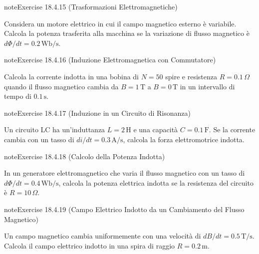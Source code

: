 \documentclass[letterpaper,10pt,italian]{jupyterBook}
\begin{document}
\begin{sphinxadmonition}{note}{Exercise 18.4.15 (Trasformazioni Elettromagnetiche)}



\sphinxAtStartPar
Considera un motore elettrico in cui il campo magnetico esterno è variabile. Calcola la potenza trasferita alla macchina se la variazione di flusso magnetico è \(d\Phi/dt = 0.2 \, \text{Wb/s}\).
\end{sphinxadmonition}
 \label{exercise:ch/electromagnetism/electromagnetism-general-problems-exercise-15}

\begin{sphinxadmonition}{note}{Exercise 18.4.16 (Induzione Elettromagnetica con Commutatore)}



\sphinxAtStartPar
Calcola la corrente indotta in una bobina di \(N = 50\) spire e resistenza \(R = 0.1 \, \Omega\) quando il flusso magnetico cambia da \(B = 1 \, \text{T}\) a \(B = 0 \, \text{T}\) in un intervallo di tempo di \(0.1 \, \text{s}\).
\end{sphinxadmonition}
 \label{exercise:ch/electromagnetism/electromagnetism-general-problems-exercise-16}

\begin{sphinxadmonition}{note}{Exercise 18.4.17 (Induzione in un Circuito di Risonanza)}



\sphinxAtStartPar
Un circuito LC ha un’induttanza \(L = 2 \, \text{H}\) e una capacità \(C = 0.1 \, \text{F}\). Se la corrente cambia con un tasso di \(di/dt = 0.3 \, \text{A/s}\), calcola la forza elettromotrice indotta.
\end{sphinxadmonition}
 \label{exercise:ch/electromagnetism/electromagnetism-general-problems-exercise-17}

\begin{sphinxadmonition}{note}{Exercise 18.4.18 (Calcolo della Potenza Indotta)}



\sphinxAtStartPar
In un generatore elettromagnetico che varia il flusso magnetico con un tasso di \(d\Phi/dt = 0.4 \, \text{Wb/s}\), calcola la potenza elettrica indotta se la resistenza del circuito è \(R = 10 \, \Omega\).
\end{sphinxadmonition}
 \label{exercise:ch/electromagnetism/electromagnetism-general-problems-exercise-18}

\begin{sphinxadmonition}{note}{Exercise 18.4.19 (Campo Elettrico Indotto da un Cambiamento del Flusso Magnetico)}



\sphinxAtStartPar
Un campo magnetico cambia uniformemente con una velocità di \(dB/dt = 0.5 \, \text{T/s}\). Calcola il campo elettrico indotto in una spira di raggio \(R = 0.2 \, \text{m}\).
\end{sphinxadmonition}
 \label{exercise:ch/electromagnetism/electromagnetism-general-problems-exercise-19}
\end{document}
